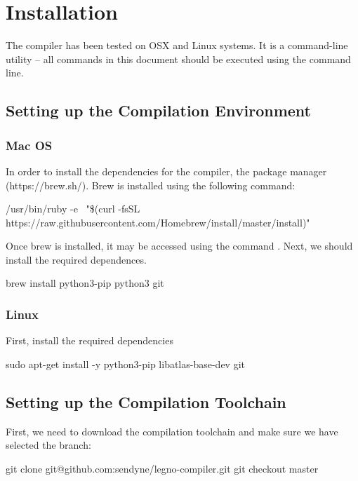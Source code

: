 \chapter{Installation}

The \legno compiler has been tested on OSX and Linux systems. It is a
command-line utility -- all commands in this document should be executed using the command line. 

\section{Setting up the Compilation Environment}
\subsection{Mac OS}


In order to install the dependencies for the \legno compiler, the  package manager (https://brew.sh/). Brew is installed using the following command:

\begin{snippet}
  /usr/bin/ruby -e \
  "\$(curl -fsSL https://raw.githubusercontent.com/Homebrew/install/master/install)"
\end{snippet}

 Once brew is installed, it may be accessed using the command . Next,
 we should install the required dependences. 

\begin{snippet}
  brew install python3-pip python3 git
\end{snippet}


\subsection{Linux}

First, install the required dependencies

\begin{snippet}
sudo apt-get install -y python3-pip libatlas-base-dev git
\end{snippet}

\section{Setting up the Compilation Toolchain}

First, we need to download the compilation toolchain and make sure we have selected the  branch:

\begin{snippet}
  git clone git@github.com:sendyne/legno-compiler.git
  git checkout master
\end{snippet}

